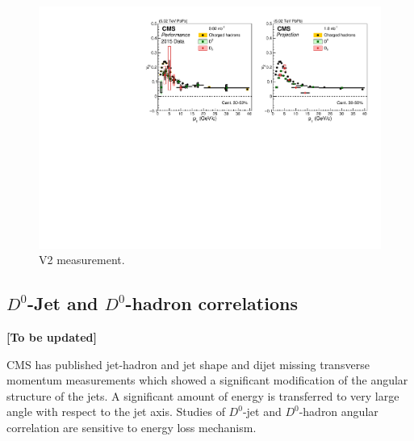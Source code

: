 \begin{figure}[!ht]
\begin{center}
\includegraphics[width=.98\textwidth]{figures/cV2_lumiMB_1.pdf}
\caption{V2 measurement.}
\label{fig:v2_projection}
\end{center}
\end{figure}



\subsection{$D^0$-Jet and $D^0$-hadron correlations}
{\bf [To be updated]}

CMS has published jet-hadron and jet shape and dijet missing transverse momentum measurements which showed a significant modification of the angular structure of the jets. A significant amount of energy is transferred to very large angle with respect to the jet axis.
Studies of $D^0$-jet and $D^0$-hadron angular correlation are sensitive to energy loss mechanism. 

